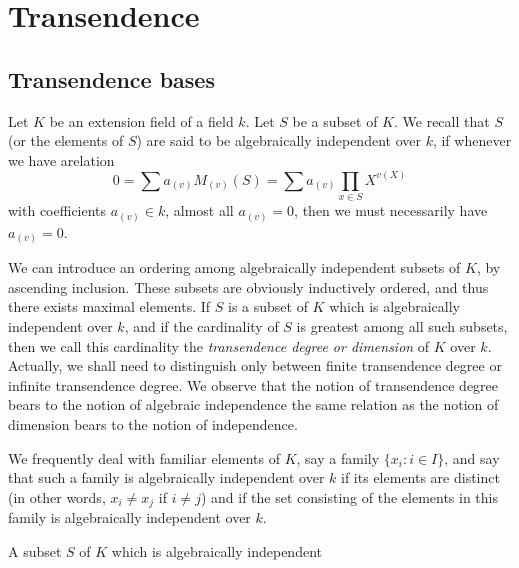 \section{Transendence}
\subsection{Transendence bases}
Let \(K\) be an extension field of a field \(k\). Let \(S\) be a subset of
\(K\). We recall that \(S\) (or the elements of \(S\)) are said to be
algebraically independent over \(k\), if whenever we have arelation
\[
  0=\sum a_{(v)}M_{(v)}(S)=\sum a_{(v)}\prod_{x\in S}X^{v(X)}
\]
with coefficients \(a_{(v)}\in k\), almost all \(a_{(v)}=0\), then we must
necessarily have \(a_{(v)}=0\).

We can introduce an ordering among algebraically independent subsets of
\(K\), by ascending inclusion. These subsets are obviously inductively
ordered, and thus there exists maximal elements. If \(S\) is a subset of
\(K\) which is algebraically independent over \(k\), and if the cardinality
of \(S\) is greatest among all such subsets, then we call this cardinality
the \emph{transendence degree or dimension} of \(K\) over \(k\). Actually,
we shall need to distinguish only between finite transendence degree or
infinite transendence degree. We observe that the notion of transendence
degree bears to the notion of algebraic independence the same relation as
the notion of dimension bears to the notion of independence.

We frequently deal with familiar elements of \(K\), say a family
\(\{x_i:i\in I\}\), and say that such a family is algebraically independent
over \(k\) if its elements are distinct (in other words, \(x_i\neq x_j\) if
\(i\neq j\)) and if the set consisting of the elements in this family is
algebraically independent over \(k\).

A subset \(S\) of \(K\) which is algebraically independent

